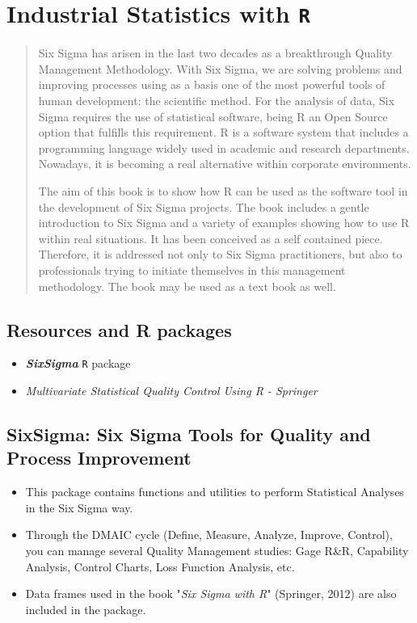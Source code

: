 \documentclass[]{article}
\begin{document}
\tableofcontents

\section{Industrial Statistics with \texttt{R}}
\begin{quote}
Six Sigma has arisen in the last two decades as a breakthrough Quality Management Methodology. With Six Sigma, we are solving problems and improving processes using as a basis one of the most powerful tools of human development: the scientific method. For the analysis of data, Six Sigma requires the use of statistical software, being R an Open Source option that fulfills this requirement. R is a software system that includes a programming language widely used in academic and research departments. Nowadays, it is becoming a real alternative within corporate environments.

 

The aim of this book is to show how R can be used as the software tool in the development of Six Sigma projects. The book includes a gentle introduction to Six Sigma and a variety of examples showing how to use R within real situations. It has been conceived as a self contained piece. Therefore, it is addressed not only to Six Sigma practitioners, but also to professionals trying to initiate themselves in this management methodology. The book may be used as a text book as well.
\end{quote}
\subsection{Resources and R packages}
\begin{itemize}
\item \textit{\textbf{SixSigma}} \texttt{R} package
\item \textit{Multivariate Statistical Quality Control Using R - Springer}
\end{itemize}
\newpagee
\subsection{\textbf{SixSigma}: Six Sigma Tools for Quality and Process Improvement}

\begin{itemize}
\item This package contains functions and utilities to perform Statistical Analyses in the Six Sigma way. 

\item Through the DMAIC cycle (Define, Measure, Analyze, Improve, Control), you can manage several Quality Management studies: Gage R\&R, Capability Analysis, Control Charts, Loss Function Analysis, etc. 

\item Data frames used in the book "\textit{Six Sigma with R}" (Springer, 2012) are also included in the package.
\end{itemize}
\end{document}
